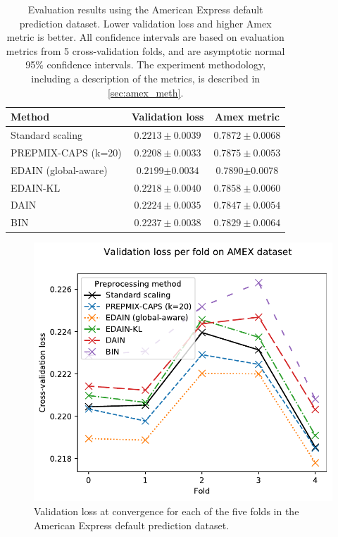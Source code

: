 \documentclass{statsmsc}
\begin{document}
{%
\begin{table}[htp]
    \centering
    \begin{tabular}{lcc}
        \toprule
        Method & Validation loss & Amex metric \\
        \midrule
        Standard scaling & $0.2213 \pm 0.0039$ & $0.7872 \pm 0.0068$ \\
        PREPMIX-CAPS (k=20) & $0.2208 \pm 0.0033$ & $0.7875 \pm 0.0053$ \\
        EDAIN (global-aware) & $\mathbf{0.2199} \bm\pm \mathbf{0.0034}$ & $\mathbf{0.7890} \bm\pm \mathbf{0.0078}$ \\
        EDAIN-KL & $0.2218 \pm 0.0040$ & $0.7858 \pm 0.0060$ \\
        DAIN & $0.2224 \pm 0.0035$ & $0.7847 \pm 0.0054$ \\
        BIN & $0.2237 \pm 0.0038$ & $0.7829 \pm 0.0064$ \\
        \bottomrule
    \end{tabular}%
    \caption{
        Evaluation results using the American Express default prediction dataset. Lower validation
        loss and higher Amex metric is better.
        All confidence intervals are based on evaluation metrics from 5 cross-validation folds,
        and are asymptotic normal 95\% confidence intervals.
        The experiment methodology, including a description of the metrics,
        is described in  \cref{sec:amex_meth}.
    }%
    \label{tab:amex_performance}%
\end{table}

\begin{figure}[htp]
    \begin{center}
        \includegraphics[scale=1]{figures/amex_performance_convergence_per_fold}
    \end{center}
    \caption{Validation loss at convergence for each of the five folds in the American Express
    default prediction dataset.}
    \label{fig:amex_folds}
\end{figure}

}
\end{document}
